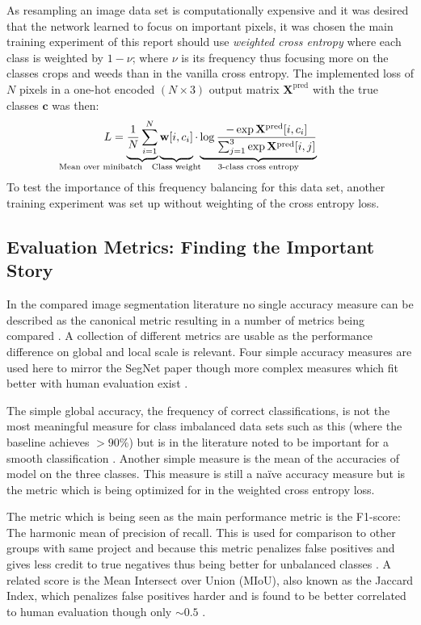 \documentclass{article}
\begin{document}
As resampling an image data set is computationally expensive and it was desired that the network learned to focus on important pixels, it was chosen the main training experiment of this report should use \textit{weighted cross entropy} where each class is weighted by \(1-\nu\); where \(\nu\) is its frequency thus focusing more on the classes crops and weeds than in the vanilla cross entropy. The implemented loss of \(N\) pixels in a one-hot encoded \((N \times  3)\) output matrix \(\mathbf X^\text{pred}\) with the true classes \(\mathbf c\) was then:
\[
L = \underbrace{
	\vphantom{\sum_{i}}
	\frac 1 N
	\sum_{\mathclap {i=1}}^{N}
}
_{\mathllap{\text{Mean over minibatch}}}
\underbrace{ 
	\vphantom{\sum_{i}}
	\mathbf{w}[i, c_i]}
_{\mathclap{\text{Class weight}}}  
\cdot 
\underbrace{
	\log 
	\frac
	{-\exp\mathbf X^\text{pred}[i, c_i]}
	{\sum_{j=1}^{3}\exp\mathbf X^\text{pred}[i, j]}
}_{\mathclap{\text{3-class cross entropy}}}
\] 
To test the importance of this frequency balancing for this data set, another training experiment was set up without weighting of the cross entropy loss.
\subsection{Evaluation Metrics: Finding the Important Story}
In the compared image segmentation literature no single accuracy measure can be described  as the canonical metric resulting in a number of metrics being compared \cite{eval, Metric}.  A collection of different metrics are usable as the performance difference on global and local scale is relevant. 
Four simple accuracy measures are used here to mirror the SegNet paper \cite{seg} though more complex measures which fit better with human evaluation exist \cite{eval}. 

The simple global accuracy, the frequency of correct classifications, is not the most meaningful measure for class imbalanced data sets such as this (where the baseline achieves \(>90\%\)) but is in the literature noted to be important for a smooth classification \cite{seg}. Another simple measure is the mean of the accuracies of model on the three classes. This measure is still a naïve accuracy measure but is the metric which is being optimized for in the weighted cross entropy loss. 

The metric which is being seen as the main performance metric is the F1-score: The harmonic mean of precision of recall. This is used for comparison to other groups with same project and because this metric penalizes false positives and gives less credit to true negatives thus being better for unbalanced classes \cite{Metric}. A related score is the Mean Intersect over Union (MIoU), also known as the Jaccard Index, which penalizes false positives harder and is found to be better correlated to human evaluation though only \(\sim 0.5\) \cite{eval}. 
\end{document}
